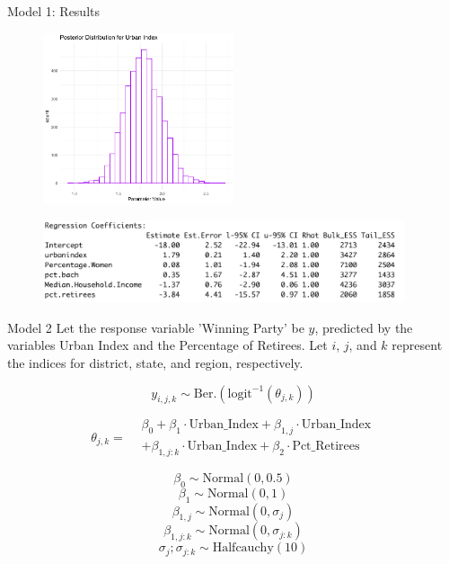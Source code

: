 \documentclass{beamer}
\begin{document}
\begin{frame}{Model 1: Results}
    \begin{center}
        \begin{figure}
            \includegraphics[width=0.5\textwidth]{plots/post_urbanindex_model1.png}
        \end{figure}
        \begin{figure}
            \includegraphics[width=0.95\textwidth]{plots/model1_summary_output.png}
        \end{figure}
    \end{center}
\end{frame}


\begin{frame}{Model 2}
    Let the response variable 'Winning Party' be \(y\), predicted by the variables Urban Index and the Percentage of Retirees. Let \(i\), \(j\), and \(k\) represent the indices for district, state, and region, respectively.

    \[
    y_{i,j,k} \sim \text{Ber.}\left(\text{logit}^{-1}(\theta_{j,k})\right)
    \]

\[
\theta_{j,k} =
\begin{aligned}
    &\beta_0 + \beta_1 \cdot \text{Urban\_Index} + \beta_{1,j} \cdot \text{Urban\_Index} \\
    &+ \beta_{1,j:k} \cdot \text{Urban\_Index} + \beta_2 \cdot \text{Pct\_Retirees}
\end{aligned}
\]



    \[\beta_0 \sim \text{Normal}(0, 0.5)\]
    \[\beta_1 \sim \text{Normal}(0, 1)\]
    \[\beta_{1,j} \sim \text{Normal}(0, \sigma_j)\]
    \[\beta_{1,j:k} \sim \text{Normal}(0, \sigma_{j:k})\]
    \[ \sigma_j; \sigma_{j:k} \sim \text{Halfcauchy}(10)\]

    
\end{frame}
\end{document}

